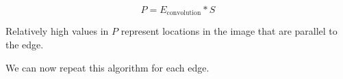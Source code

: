 \documentclass{article}
\begin{document}
$$P = E_\text{convolution} * S$$

Relatively high values in $P$ represent locations in the image that are parallel to the edge.

We can now repeat this algorithm for each edge.


\end{document}
